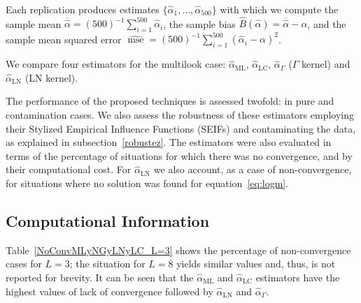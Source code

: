 \documentclass[twocolumn]{svjour3}
\begin{document}
	Each replication produces estimates $\{\widehat{\alpha}_1, \dots, \widehat{\alpha}_{500}\}$ with which we compute 
	the sample mean $\overline{\widehat{\alpha}}=(500)^{-1}{\sum_{i=1}^{500}{\widehat{\alpha}_i}}$, 
	the sample bias $\widehat{B}(\widehat\alpha) = \overline{\widehat\alpha}- \alpha$, 
	and 
	the sample mean squared error $\widehat{\operatorname{mse}}=({500})^{-1}{\sum_{i=1}^{500}{(\widehat{\alpha}_i-\alpha)^2}}$.
	
	
	We compare four estimators for the multilook case: 
	$\widehat{\alpha}_{\text{{ML}}}$, 
	$\widehat{\alpha}_{\text{{LC}}}$, 
	$\widehat{\alpha}_{\Gamma}$ ($\Gamma$ kernel) and $\widehat{\alpha}_{\text{{LN}}}$ (LN kernel).
	
	The performance of the proposed techniques is assessed twofold: in pure and contamination cases. 
	We also assess the robustness of these estimators employing their Stylized Empirical Influence Functions (SEIFs) and contaminating the data, as explained in subsection~\ref{robustez}. 
	The estimators were also evaluated in terms of the percentage of situations for which there was no convergence, and by their computational cost. 
	For $\widehat{\alpha}_{\text{{LN}}}$ we also account, as a case of non-convergence, for situations where no solution was found for equation~\eqref{eq:logm}.
	
	
	\subsection{Computational Information}
	
	Table~\ref{NoConvMLyNGyLNyLC_L=3} shows the percentage of non-convergence cases for $L=3$; the situation for $L=8$ yields similar values and, thus, is not reported for brevity.
	It can be seen that the $\widehat{\alpha}_{\text{{ML}}}$ and $\widehat{\alpha}_{\text{{LC}}}$ estimators have the highest values of lack of convergence followed by  $\widehat{\alpha}_{\text{{LN}}}$ and $\widehat{\alpha}_{\Gamma}$.
	
\end{document}
